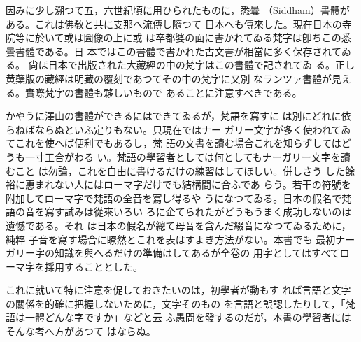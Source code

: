 \numberParagraph
因みに少し溯つて五，六世紀頃に用ひられたものに，悉曇
（Siddhām）書體がある。これは佛敎と共に支那へ流傳し隨つて
日本へも傳來した。現在日本の寺院等に於いて或は圖像の上に或
は卒都婆の面に書かれてゐる梵字は卽ちこの悉曇書體である。日
本ではこの書體で書かれた古文書が相當に多く保存されてゐる。
尙ほ日本で出版された大藏經の中の梵字はこの書體で記されてゐ
る。正し黄蘗版の藏經は明藏の覆刻であつてその中の梵字に又別
なランツァ書體が見える。實際梵字の書體も夥しいもので
あることに注意すべきである。

かやうに澤山の書體ができるにはできてゐるが，梵語を寫すに
は別にどれに依らねばならぬといふ定りもない。只現在ではナー
ガリー文字が多く使われてゐてこれを使へば便利でもあるし，梵
語の文書を讀む場合これを知らずしてはどうも一寸工合がわる
い。梵語の學習者としては何としてもナーガリー文字を讀むこと
は勿論，これを自由に書けるだけの練習はしてほしい。併しさう
した餘裕に惠まれない人にはローマ字だけでも結構間に合ふであ
らう。若干の符號を附加してローマ字で梵語の全音を寫し得るや
うになつてゐる。日本の假名で梵語の音を寫す試みは從來いろい
ろに企てられたがどうもうまく成功しないのは遺憾である。それ
は日本の假名が總て母音を含んだ綴音になつてゐるために，純粹
子音を寫す場合に瞭然とこれを表はすよき方法がない。本書でも
最初ナーガリー字の知識を與へるだけの準備はしてあるが全卷の
用字としてはすべてローマ字を採用することとした。

これに就いて特に注意を促しておきたいのは，初學者が動もす
れば言語と文字の關係を的確に把握しないために，文字そのもの
を言語と誤認したりして，「梵語は一體どんな字ですか」などと云
ふ愚問を發するのだが，本書の學習者にはそんな考へ方があつて
はならぬ。

